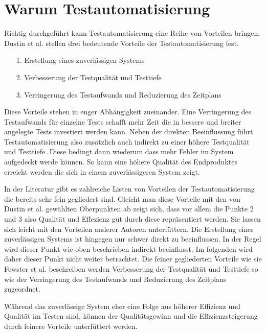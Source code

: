 \section{Warum Testautomatisierung}
\label{sec:warum_testautomatisierung}

Richtig durchgeführt kann Testautomatisierung eine Reihe von Vorteilen bringen. Dustin et al. stellen drei bedeutende Vorteile der Testautomatisierung fest. \cite[S.44 ff.]{dustin_software_2001}
\begin{itemize}
\item[1.] Erstellung eines zuverlässigen Systems
\item[2.] Verbesserung der Testqualität und Testtiefe
\item[3.] Verringerung des Testaufwands und Reduzierung des Zeitplans
\end{itemize}

Diese Vorteile stehen in enger Abhängigkeit zueinander. Eine Verringerung des Testaufwands für einzelne Tests schafft mehr Zeit die in bessere und breiter angelegte Tests investiert werden kann. Neben der direkten Beeinflussung führt Testautomatisierung also zusätzlich auch indirekt zu einer höhere Testqualität und Testtiefe. Diese bedingt dann wiederum dass mehr Fehler im System aufgedeckt werde können. So kann eine höhere Qualität des Endproduktes erreicht werden die sich in einem zuverlässigeren System zeigt.

In der Literatur gibt es zahlreiche Listen von Vorteilen der Testautomatisierung die bereits sehr fein gegliedert sind. \cite{fewster_software_1999} \cite{thaller_software-test_2002}
Gleicht man diese Vorteile mit den von Dustin et al. gewählten Oberpunkten ab zeigt sich, dass vor allem die Punkte 2 und 3 also Qualität und Effezienz gut durch diese repräsentiert werden. Sie lassen sich leicht mit den Vorteilen anderer Autoren unterfüttern. Die Erstellung eines zuverlässigen Systems ist hingegen nur schwer direkt zu beeinflussen. In der Regel wird dieser Punkt wie oben beschrieben indirekt beeinflusst.
Im folgenden wird daher dieser Punkt nicht weiter betrachtet. Die feiner gegliederten Vorteile wie sie Fewster et al. beschreiben werden Verbesserung der Testqualität und Testtiefe so wie der Verringerung des Testaufwands und Reduzierung des Zeitplans zugeordnet.


Während das zuverlässige System eher eine Folge aus höherer Effizienz und Qualität im Testen sind, können der Qualitätsgewinn und die Effizienzsteigerung durch feinere Vorteile unterfüttert werden.



